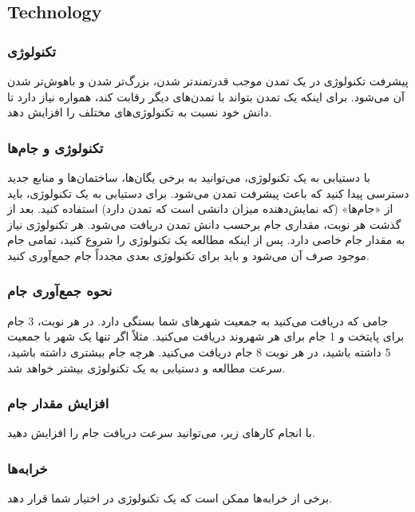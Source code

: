 \documentclass[]{article}
\begin{document}
\subsection*{{\titr Technology}}


\subsubsection*{{\titr تکنولوژی}}
پیشرفت تکنولوژی در یک تمدن موجب قدرتمندتر شدن، بزرگ‌تر شدن و باهوش‌تر شدن آن می‌شود. برای اینکه یک تمدن بتواند با تمدن‌های دیگر رقابت کند، همواره نیاز دارد تا دانش خود نسبت به تکنولوژی‌های مختلف را افزایش دهد.

\subsubsection*{{\titr تکنولوژی و جام‌ها}}
با دستیابی به یک تکنولوژی، می‌توانید به برخی یگان‌ها، ساختمان‌ها و منابع جدید دسترسی پیدا کنید که باعث پیشرفت تمدن می‌شود. برای دستیابی به یک تکنولوژی، باید از «جام‌ها» (که نمایش‌دهنده میزان دانشی است که تمدن دارد) استفاده کنید.
بعد از گذشت هر نوبت، مقداری جام برحسب دانش تمدن دریافت می‌شود. هر تکنولوژی نیاز به مقدار جام خاصی دارد. پس از اینکه مطالعه یک تکنولوژی را شروع کنید، تمامی جام موجود صرف آن می‌شود و باید برای تکنولوژی بعدی مجدداً جام جمع‌آوری کنید.

\subsubsection*{{\titr نحوه جمع‌آوری جام}}
جامی که دریافت می‌کنید به جمعیت شهرهای شما بستگی دارد. در هر نوبت، 3 جام برای پایتخت و 1 جام برای هر شهروند دریافت می‌کنید. مثلاً اگر تنها یک شهر با جمعیت 5 داشته باشید، در هر نوبت 8 جام دریافت می‌کنید. هرچه جام بیشتری داشته باشید، سرعت مطالعه و دستیابی به یک تکنولوژی بیشتر خواهد شد.

\subsubsection*{{\titr افزایش مقدار جام}}
 با انجام کارهای زیر، می‌توانید سرعت دریافت جام را افزایش دهید.

\subsubsection*{{\titr خرابه‌ها}}
برخی از خرابه‌ها ممکن است که یک تکنولوژی در اختیار شما قرار دهد.
\end{document}
